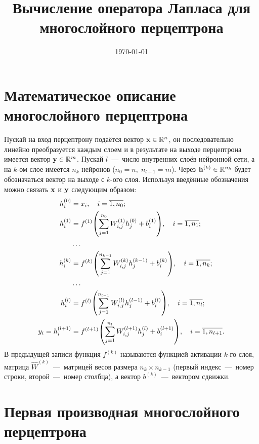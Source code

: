 \documentclass[11pt]{article}
\title{Вычисление оператора Лапласа для многослойного перцептрона}
\date{\today}
\begin{document}
\maketitle

\section{Математическое описание многослойного перцептрона}

Пускай на вход перцептрону подаётся вектор $\vb{x}\in\mathbb{R}^n$, он последовательно линейно преобразуется каждым слоем и в результате на выходе перцептрона имеется вектор $\vb{y}\in\mathbb{R}^m$. Пускай $l$~---~число внутренних слоёв нейронной сети, а на $k$-ом слое имеется $n_k$ нейронов ($n_0=n,\; n_{l+1}=m$). Через $\vb{h}^{(k)}\in\mathbb{R}^{n_k}$ будет обозначаться вектор на выходе с $k$-ого слоя. Используя введённые обозначения можно связать $\vb{x}$ и $\vb{y}$ следующим образом:
\begin{equation}
    \begin{split}
        h^{(0)}_i &= x_i,\quad i=\overline{1,n_0};\\
        h^{(1)}_i &= f^{(1)}\qty(\sum_{j=1}^{n_0} W^{(1)}_{i,j} h^{(0)}_j + b^{(1)}_i),\quad i=\overline{1,n_1};\\
        & \ldots\\
        h^{(k)}_i &= f^{(k)}\qty(\sum_{j=1}^{n_{k-1}} W^{(k)}_{i,j} h^{(k-1)}_j + b^{(k)}_i),\quad i=\overline{1,n_k};\\
        & \ldots\\
        h^{(l)}_i &= f^{(l)}\qty(\sum_{j=1}^{n_{l-1}} W^{(l)}_{i,j} h^{(l-1)}_j + b^{(l)}_i),\quad i=\overline{1,n_l};\\
        y_i = h^{(l+1)}_i &= f^{(l+1)}\qty(\sum_{j=1}^{n_{l}} W^{(l+1)}_{i,j} h^{(l)}_j + b^{(l+1)}_i),\quad i=\overline{1,n_{l+1}}.
    \end{split}
    \label{eq:perc}
\end{equation}
В предыдущей записи функция $f^{(k)}$ называются функцией активации $k$-го слоя, матрица $\hat W^{(k)}$~---~матрицей весов размера $n_k \times n_{k-1}$ (первый индекс~---~номер строки, второй~---~номер столбца), а вектор $b^{(k)}$~---~вектором сдвижки.

\section{Первая производная многослойного перцептрона}
\end{document}
